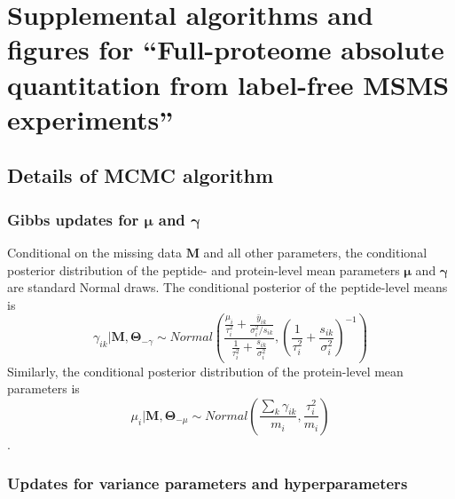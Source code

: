 


\chapter{Supplemental algorithms and figures for ``Full-proteome absolute quantitation from label-free MSMS experiments''}


\section{Details of MCMC algorithm}
\label{sec:mcmcDetails}

\subsection{Gibbs updates for $\bm \mu$ and $\bm \gamma$}
\label{sc:draw_intensity_parameters}

Conditional on the missing data $\bm M$ and all other parameters, the conditional posterior distribution of the peptide- and protein-level mean parameters $\bm \mu$ and $\bm \gamma$ are standard Normal draws.
The conditional posterior of the peptide-level means is
\begin{equation*}
\gamma_{ik} | \bm M, \bm \Theta_{-\gamma} \sim Normal\left(\frac{\frac{\mu_{i}}{\tau_{i}^{2}}+\frac{\bar{y}_{ik}}{\sigma_{i}^{2}/s_{ik}}}{\frac{1}{\tau_{i}^{2}}+\frac{s_{ik}}{\sigma_{i}^{2}}},\left(\frac{1}{\tau_{i}^{2}}+\frac{s_{ik}}{\sigma_{i}^{2}}\right)^{-1}\right)
\end{equation*}
Similarly, the conditional posterior distribution of the protein-level mean parameters is
\begin{equation*}
\mu_{i} | \bm M, \bm \Theta_{-\mu} \sim Normal\left(\frac{\sum_{k}\gamma_{ik}}{m_{i}},\frac{\tau_{i}^{2}}{m_{i}}\right)
\end{equation*}
. 

\subsection{Updates for variance parameters and hyperparameters}


